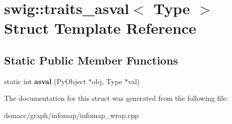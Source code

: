 \hypertarget{structswig_1_1traits__asval}{}\section{swig\+:\+:traits\+\_\+asval$<$ Type $>$ Struct Template Reference}
\label{structswig_1_1traits__asval}
\subsection*{Static Public Member Functions}
\begin{DoxyCompactItemize}
\item 
\mbox{\label{structswig_1_1traits__asval_a5d0ee3dd0c23458db2aeae93d8c02bc0}} 
static int {\bfseries asval} (Py\+Object $\ast$obj, Type $\ast$val)
\end{DoxyCompactItemize}


The documentation for this struct was generated from the following file\+:\begin{DoxyCompactItemize}
\item 
dsmacc/graph/infomap/infomap\+\_\+wrap.\+cpp\end{DoxyCompactItemize}

